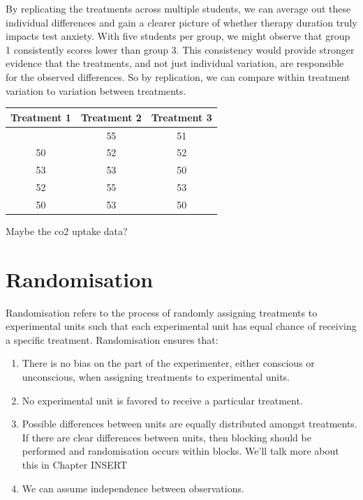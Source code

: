 \documentclass[
  letterpaper,
  DIV=11,
  numbers=noendperiod,
  oneside]{scrreprt}
\begin{document}
By replicating the treatments across multiple students, we can average
out these individual differences and gain a clearer picture of whether
therapy duration truly impacts test anxiety. With five students per
group, we might observe that group 1 consistently scores lower than
group 3. This consistency would provide stronger evidence that the
treatments, and not just individual variation, are responsible for the
observed differences. So by replication, we can compare within treatment
variation to variation between treatments.

\begin{longtable}[]{@{}ccc@{}}
\toprule\noalign{}
Treatment 1 & Treatment 2 & Treatment 3 \\
\midrule\noalign{}
\endhead
\bottomrule\noalign{}
\endlastfoot
48 & 55 & 51 \\
50 & 52 & 52 \\
53 & 53 & 50 \\
52 & 55 & 53 \\
50 & 53 & 50 \\
\end{longtable}

\begin{tcolorbox}[enhanced jigsaw, colframe=quarto-callout-tip-color-frame, breakable, arc=.35mm, toptitle=1mm, colback=white, title={Example 3.1}, opacityback=0, bottomrule=.15mm, opacitybacktitle=0.6, colbacktitle=quarto-callout-tip-color!10!white, toprule=.15mm, rightrule=.15mm, bottomtitle=1mm, leftrule=.75mm, titlerule=0mm, coltitle=black, left=2mm]

Maybe the co2 uptake data?

\end{tcolorbox}

\section{Randomisation}\label{randomisation}

Randomisation refers to the process of randomly assigning treatments to
experimental units such that each experimental unit has equal chance of
receiving a specific treatment. Randomisation ensures that:

\begin{enumerate}
\def\labelenumi{\arabic{enumi}.}
\item
  There is no bias on the part of the experimenter, either conscious or
  unconscious, when assigning treatments to experimental units.
\item
  No experimental unit is favored to receive a particular treatment.
\item
  Possible differences between units are equally distributed amongst
  treatments. If there are clear differences between units, then
  blocking should be performed and randomisation occurs within blocks.
  We'll talk more about this in Chapter INSERT
\item
  We can assume independence between observations.
\end{enumerate}
\end{document}
